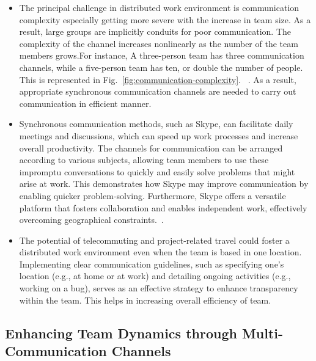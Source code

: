 \documentclass{llncs}
\begin{document}
\begin{itemize}
    \item The principal challenge in distributed work environment is  communication complexity especially getting more severe with the increase in team size. As a result, large groups are implicitly conduits for poor communication. The complexity of the channel increases nonlinearly as the number of the team members grows.For instance, A three-person team has three communication channels, while a five-person team has ten, or double the number of people. This is represented in Fig.~\ref{fig:communication-complexity}. ~\cite{refpaper7}. As a result, appropriate synchronous communication channels are needed to carry out communication in efficient manner.~\cite{refpaper7} \\ 
    \item Synchronous communication methods, such as Skype, can facilitate daily meetings and discussions, which can speed up work processes and increase overall productivity. The channels for communication can be arranged according to various subjects, allowing team members to use these impromptu conversations to quickly and easily solve problems that might arise at work. This demonstrates how Skype may improve communication by enabling quicker problem-solving. Furthermore, Skype offers a versatile platform that fosters collaboration and enables independent work, effectively overcoming geographical constraints.~\cite{refpaper8}. \\
    \item The potential of telecommuting and project-related travel could foster a distributed work environment even when the team is based in one location. Implementing clear communication guidelines, such as specifying one's location (e.g., at home or at work) and detailing ongoing activities (e.g., working on a bug), serves as an effective strategy to enhance transparency within the team. This helps in increasing overall efficiency of team.~\cite{refpaper8}
\end{itemize}

\subsection{Enhancing Team Dynamics through Multi-Communication Channels}
\end{document}
